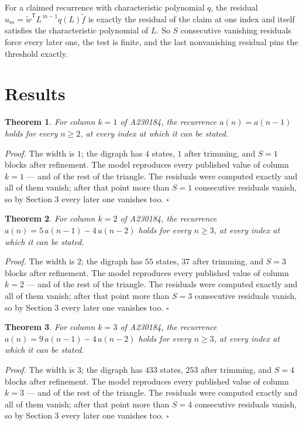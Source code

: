\documentclass[11pt]{article}
\newtheorem{theorem}{Theorem}
\theoremstyle{definition}
\begin{document}
For a claimed recurrence with characteristic polynomial $q$, the residual $u_m = \tilde w^{\mathsf T}L^{\,m-1}q(L)\tilde f$ is exactly the residual of the claim at one index and itself satisfies the characteristic polynomial of $L$. So $S$ consecutive vanishing residuals force every later one, the test is finite, and the last nonvanishing residual pins the threshold exactly.

\section{Results}

\begin{theorem} For column $k = 1$ of A230184, the recurrence $a(n) = a(n-1)$ holds for every $n \ge 2$, at every index at which it can be stated.\end{theorem}

{\itshape Proof.} The width is $1$; the digraph has $4$ states, $1$ after trimming, and $S = 1$ blocks after refinement. The model reproduces every published value of column $k = 1$ --- and of the rest of the triangle. The residuals were computed exactly and all of them vanish; after that point more than $S = 1$ consecutive residuals vanish, so by Section 3 every later one vanishes too. $\square$

\begin{theorem} For column $k = 2$ of A230184, the recurrence $a(n) = 5\,a(n-1) - 4\,a(n-2)$ holds for every $n \ge 3$, at every index at which it can be stated.\end{theorem}

{\itshape Proof.} The width is $2$; the digraph has $55$ states, $37$ after trimming, and $S = 3$ blocks after refinement. The model reproduces every published value of column $k = 2$ --- and of the rest of the triangle. The residuals were computed exactly and all of them vanish; after that point more than $S = 3$ consecutive residuals vanish, so by Section 3 every later one vanishes too. $\square$

\begin{theorem} For column $k = 3$ of A230184, the recurrence $a(n) = 9\,a(n-1) - 4\,a(n-2)$ holds for every $n \ge 3$, at every index at which it can be stated.\end{theorem}

{\itshape Proof.} The width is $3$; the digraph has $433$ states, $253$ after trimming, and $S = 4$ blocks after refinement. The model reproduces every published value of column $k = 3$ --- and of the rest of the triangle. The residuals were computed exactly and all of them vanish; after that point more than $S = 4$ consecutive residuals vanish, so by Section 3 every later one vanishes too. $\square$
\end{document}
